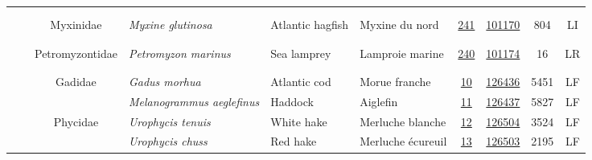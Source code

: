 \documentclass[12pt]{article}\usepackage[]{graphicx}\usepackage[]{color}
\begin{document}
\begin{landscape}
\begin{longtable}[t]{ccc>{\centering\arraybackslash}p{3cm}>{\centering\arraybackslash}p{3cm}>{\centering\arraybackslash}p{3cm}>{}c>{}ccc}
\endfoot
\bottomrule
\endlastfoot
\addlinespace[0.3em]
\\
\addlinespace[0.3em]
\\
\hspace{1em}\hspace{1em} &  & Myxinidae & \em{Myxine glutinosa} & Atlantic hagfish & Myxine du nord & \href{#sec:241}{241} & \href{http://www.marinespecies.org/aphia.php?p=taxdetails&id=101170}{101170} & 804 & LI\\
\pagebreak[0]
\addlinespace[0.3em]
\\
\addlinespace[0.3em]
\\
\hspace{1em}\hspace{1em} &  & Petromyzontidae & \em{Petromyzon marinus} & Sea lamprey & Lamproie marine & \href{#sec:240}{240} & \href{http://www.marinespecies.org/aphia.php?p=taxdetails&id=101174}{101174} & 16 & LR\\
\pagebreak[0]
\addlinespace[0.3em]
\\
\addlinespace[0.3em]
\\
\hspace{1em}\hspace{1em} &  & Gadidae & \em{Gadus morhua} & Atlantic cod & Morue franche & \href{#sec:10}{10} & \href{http://www.marinespecies.org/aphia.php?p=taxdetails&id=126436}{126436} & 5451 & LF\\
\nopagebreak
\hspace{1em}\hspace{1em} &  &  & \em{Melanogrammus aeglefinus} & Haddock & Aiglefin & \href{#sec:11}{11} & \href{http://www.marinespecies.org/aphia.php?p=taxdetails&id=126437}{126437} & 5827 & LF\\
\nopagebreak
\hspace{1em}\hspace{1em} &  & Phycidae & \em{Urophycis tenuis} & White hake & Merluche blanche & \href{#sec:12}{12} & \href{http://www.marinespecies.org/aphia.php?p=taxdetails&id=126504}{126504} & 3524 & LF\\
\nopagebreak
\hspace{1em}\hspace{1em} &  &  & \em{Urophycis chuss} & Red hake & Merluche écureuil & \href{#sec:13}{13} & \href{http://www.marinespecies.org/aphia.php?p=taxdetails&id=126503}{126503} & 2195 & LF\\

\end{longtable}
\end{landscape}
\end{document}
